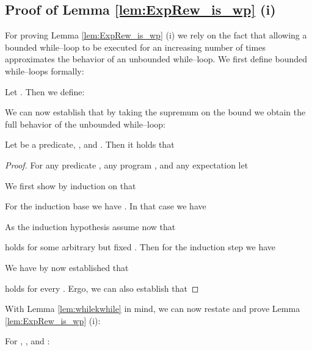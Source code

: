 \subsection{Proof of Lemma \ref{lem:ExpRew_is_wp} (i)}
\label{proofof:ExpRew_is_wp}

For proving Lemma \ref{lem:ExpRew_is_wp} (i) we rely on the fact that allowing a bounded while--loop to be executed for an increasing number of times approximates the behavior of an unbounded while--loop.
We first define bounded while--loops formally:

\begin{definition}
Let . Then we define:

\end{definition}

We can now establish that by taking the supremum on the bound  we obtain the full behavior of the unbounded while--loop:

\begin{lemma}
\label{lem:whilekwhile}
Let  be a predicate, , and .
Then it holds that

\end{lemma}

\begin{proof}
For any predicate , any program , and any expectation  let

We first show by induction on  that

For the induction base we have .
In that case we have

As the induction hypothesis assume now that 

holds for some arbitrary but fixed .
Then for the induction step we have

We have by now established that

holds for every . Ergo, we can also establish that
\baselineskip

\end{proof}

With Lemma \ref{lem:whilekwhile} in mind, we can now restate and prove Lemma \ref{lem:ExpRew_is_wp} (i):

\begingroup
\def\thelemma{\ref{lem:ExpRew_is_wp} (i)}
\begin{lemma}
For , , and :

\end{lemma}
\addtocounter{lemma}{-1}
\endgroup



